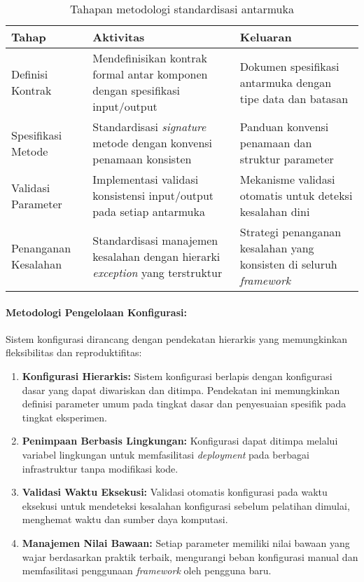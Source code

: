 \documentclass[12pt,a4paper]{article}
\begin{document}
\begin{table}[H]
\centering
\caption{Tahapan metodologi standardisasi antarmuka}
\label{tab:metodologi-interface}
\small
\begin{tabular}{|l|p{5cm}|p{6cm}|}
\hline
\textbf{Tahap} & \textbf{Aktivitas} & \textbf{Keluaran} \\ \hline
Definisi Kontrak & Mendefinisikan kontrak formal antar komponen dengan spesifikasi input/output & Dokumen spesifikasi antarmuka dengan tipe data dan batasan \\ \hline
Spesifikasi Metode & Standardisasi \textit{signature} metode dengan konvensi penamaan konsisten & Panduan konvensi penamaan dan struktur parameter \\ \hline
Validasi Parameter & Implementasi validasi konsistensi input/output pada setiap antarmuka & Mekanisme validasi otomatis untuk deteksi kesalahan dini \\ \hline
Penanganan Kesalahan & Standardisasi manajemen kesalahan dengan hierarki \textit{exception} yang terstruktur & Strategi penanganan kesalahan yang konsisten di seluruh \textit{framework} \\ \hline
\end{tabular}
\end{table}

\paragraph{Metodologi Pengelolaan Konfigurasi:}
Sistem konfigurasi dirancang dengan pendekatan hierarkis yang memungkinkan fleksibilitas dan reproduktifitas:

\begin{enumerate}[label=\arabic*., leftmargin=*, nosep]
\item \textbf{Konfigurasi Hierarkis:} Sistem konfigurasi berlapis dengan konfigurasi dasar yang dapat diwariskan dan ditimpa. Pendekatan ini memungkinkan definisi parameter umum pada tingkat dasar dan penyesuaian spesifik pada tingkat eksperimen.

\item \textbf{Penimpaan Berbasis Lingkungan:} Konfigurasi dapat ditimpa melalui variabel lingkungan untuk memfasilitasi \textit{deployment} pada berbagai infrastruktur tanpa modifikasi kode.

\item \textbf{Validasi Waktu Eksekusi:} Validasi otomatis konfigurasi pada waktu eksekusi untuk mendeteksi kesalahan konfigurasi sebelum pelatihan dimulai, menghemat waktu dan sumber daya komputasi.

\item \textbf{Manajemen Nilai Bawaan:} Setiap parameter memiliki nilai bawaan yang wajar berdasarkan praktik terbaik, mengurangi beban konfigurasi manual dan memfasilitasi penggunaan \textit{framework} oleh pengguna baru.
\end{enumerate}
\end{document}
